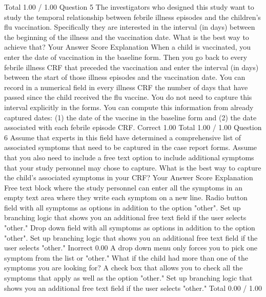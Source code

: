 Total		1.00 / 1.00	
Question 5
The investigators who designed this study want to study the temporal relationship between febrile illness episodes and the children's flu vaccination. Specifically they are interested in the interval (in days) between the beginning of the illness and the vaccination date. What is the best way to achieve that?
Your Answer		Score	Explanation
When a child is vaccinated, you enter the date of vaccination in the baseline form. Then you go back to every febrile illness CRF that preceded the vaccination and enter the interval (in days) between the start of those illness episodes and the vaccination date.			
You can record in a numerical field in every illness CRF the number of days that have passed since the child received the flu vaccine.			
You do not need to capture this interval explicitly in the forms. You can compute this information from already captured dates: (1) the date of the vaccine in the baseline form and (2) the date associated with each febrile episode CRF.	Correct	1.00	
Total		1.00 / 1.00	
Question 6
Assume that experts in this field have determined a comprehensive list of associated symptoms that need to be captured in the case report forms. Assume that you also need to include a free text option to include additional symptoms that your study personnel may chose to capture. What is the best way to capture the child's associated symptoms in your CRF?
Your Answer		Score	Explanation
Free text block where the study personnel can enter all the symptoms in an empty text area where they write each symptom on a new line.			
Radio button field with all symptoms as options in addition to the option "other". Set up branching logic that shows you an additional free text field if the user selects "other."			
Drop down field with all symptoms as options in addition to the option "other". Set up branching logic that shows you an additional free text field if the user selects "other."	Inorrect	0.00	A drop down menu only forces you to pick one symptom from the list or "other." What if the child had more than one of the symptoms you are looking for?
A check box that allows you to check all the symptoms that apply as well as the option "other." Set up branching logic that shows you an additional free text field if the user selects "other."			
Total		0.00 / 1.00
